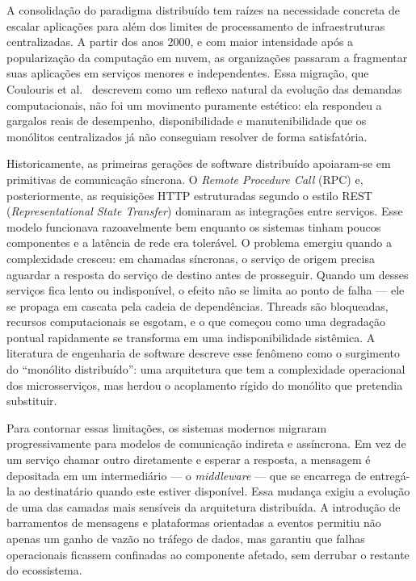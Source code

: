 \documentclass[12pt, a4paper]{article}
\begin{document}
A consolidação do paradigma distribuído tem raízes na necessidade concreta de escalar aplicações para além dos limites de processamento de infraestruturas centralizadas. A partir dos anos 2000, e com maior intensidade após a popularização da computação em nuvem, as organizações passaram a fragmentar suas aplicações em serviços menores e independentes. Essa migração, que Coulouris et al.\ \cite{coulouris2012} descrevem como um reflexo natural da evolução das demandas computacionais, não foi um movimento puramente estético: ela respondeu a gargalos reais de desempenho, disponibilidade e manutenibilidade que os monólitos centralizados já não conseguiam resolver de forma satisfatória.

Historicamente, as primeiras gerações de software distribuído apoiaram-se em primitivas de comunicação síncrona. O \textit{Remote Procedure Call} (RPC) e, posteriormente, as requisições HTTP estruturadas segundo o estilo REST (\textit{Representational State Transfer}) dominaram as integrações entre serviços. Esse modelo funcionava razoavelmente bem enquanto os sistemas tinham poucos componentes e a latência de rede era tolerável. O problema emergiu quando a complexidade cresceu: em chamadas síncronas, o serviço de origem precisa aguardar a resposta do serviço de destino antes de prosseguir. Quando um desses serviços fica lento ou indisponível, o efeito não se limita ao ponto de falha --- ele se propaga em cascata pela cadeia de dependências. Threads são bloqueadas, recursos computacionais se esgotam, e o que começou como uma degradação pontual rapidamente se transforma em uma indisponibilidade sistêmica. A literatura de engenharia de software descreve esse fenômeno como o surgimento do ``monólito distribuído'': uma arquitetura que tem a complexidade operacional dos microsserviços, mas herdou o acoplamento rígido do monólito que pretendia substituir.

Para contornar essas limitações, os sistemas modernos migraram progressivamente para modelos de comunicação indireta e assíncrona. Em vez de um serviço chamar outro diretamente e esperar a resposta, a mensagem é depositada em um intermediário --- o \textit{middleware} --- que se encarrega de entregá-la ao destinatário quando este estiver disponível. Essa mudança exigiu a evolução de uma das camadas mais sensíveis da arquitetura distribuída. A introdução de barramentos de mensagens e plataformas orientadas a eventos permitiu não apenas um ganho de vazão no tráfego de dados, mas garantiu que falhas operacionais ficassem confinadas ao componente afetado, sem derrubar o restante do ecossistema.
\end{document}

